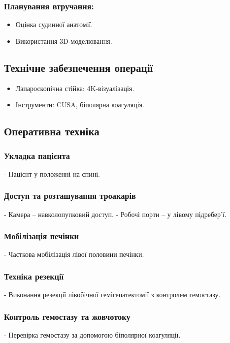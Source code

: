 \begin{refsection}
\subsubsection{Планування втручання:}
\begin{itemize}
    \item Оцінка судинної анатомії.
    \item Використання 3D-моделювання.
\end{itemize}

\subsection{Технічне забезпечення операції}
\begin{itemize}
    \item Лапароскопічна стійка: 4K-візуалізація.
    \item Інструменти: CUSA, біполярна коагуляція.
\end{itemize}

\subsection{Оперативна техніка}
\subsubsection{Укладка пацієнта}
- Пацієнт у положенні на спині.

\subsubsection{Доступ та розташування троакарів}
- Камера – навколопупковий доступ.
- Робочі порти – у лівому підребер'ї.

\subsubsection{Мобілізація печінки}
- Часткова мобілізація лівої половини печінки.

\subsubsection{Техніка резекції}
- Виконання резекції лівобічної гемігепатектомії з контролем гемостазу.

\subsubsection{Контроль гемостазу та жовчотоку}
- Перевірка гемостазу за допомогою біполярної коагуляції.


\end{refsection}
